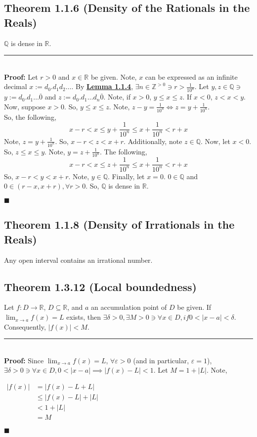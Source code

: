 \documentclass[11pt]{book}
\newcommand{\R}{\mathbb{R}}
\newcommand{\Q}{\mathbb{Q}}
\newcommand{\Z}{\mathbb{Z}}
\newcommand{\horline}{\noindent\rule{14.25cm}{0.6pt}\\}
\newcounter{theorem}
\newcounter{lemma}
\newcommand{\QED}{\begin{flushright}$\blacksquare$\end{flushright}}
\begin{document}
	\subsection{Theorem 1.1.6 (Density of the Rationals in the Reals)}
	\label{subsec:theorem116}
		\begin{theor}
			$\Q$ is dense in $\R$.\hfill\break
			\horline
			\textbf{Proof:} Let $r>0$ and $x \in \R$ be given. Note, $x$ can be expressed as an infinite
			decimal $x := d_0.d_1d_2\dots$. By \hyperref[subsec:lemma114]{\textbf{Lemma 1.1.4}}, $\exists n \in \Z^{>0} \ni r > \frac{1}{10^n}$.
			Let $y,z \in \Q \ni$ $y := d_0.d_1\dots \overline{0}$ and $z := d_0.d_1\dots d_n \overline{0}$. Note,
			if $x > 0$, $y \leq x \leq z$. If $x < 0$, $z < x < y$.\hfill\break
			Now, suppose $x > 0$. So, $y \leq x \leq z$. Note, $z - y = \frac{1}{10^n} \Leftrightarrow z = y + \frac{1}{10^n}$.\\
			So, the following,
			$$ x-r < x \leq y + \frac{1}{10^n} \leq x + \frac{1}{10^n} < r + x$$
			Note, $z = y + \frac{1}{10^n}$. So, $x - r < z < x+r$. Additionally, note $z \in \Q$.\hfill\break
			Now, let $x < 0$. So, $z \leq x \leq y$. Note, $y = z + \frac{1}{10^n}$. The following,
			$$x - r < x \leq z + \frac{1}{10^n} \leq x + \frac{1}{10^n} < r + x$$
			So, $x - r < y < x + r$. Note, $y \in \Q$. Finally, let $x = 0$. $0 \in \Q$ and $0 \in (r-x,x+r), \forall r > 0$.
			So, $\Q$ is dense in $\R$. \QED
		\end{theor}
	\subsection{Theorem 1.1.8 (Density of Irrationals in the Reals)}
	\label{subsec:theorem118}
		\begin{theor}
			Any open interval contains an irrational number.
		\end{theor}
	\subsection{Theorem 1.3.12 (Local boundedness)}
	\label{subsec:theor1312}
		\begin{theor}
			Let $f: D \to \R$, $D \subseteq \R$, and $a$ an accumulation point of $D$ be given. If $\displaystyle\lim_{x \to a}{f(x) = L}$
			exists, then $\exists \delta > 0, \exists M > 0 \ni \forall x \in D, if 0 < |x - a| < \delta$. Consequently, 
			$|f(x)| < M$.\\
			\horline
			\textbf{Proof:} Since $\displaystyle\lim_{x \to a}{f(x) = L}$, $\forall \varepsilon > 0$ (and in particular, $\varepsilon = 1$), $\exists \delta > 0 \ni
			\forall x \in D, 0 < | x - a| \implies |f(x) - L| < 1$. Let $M = 1 + |L|$. Note,
			\begin{center}
				\begin{math}
					\begin{aligned}
						|f(x)| &  = |f(x) - L + L|\\
						& \leq |f(x) - L| + |L|\\
						& < 1+ |L|\\
						& = M
					\end{aligned}
				\end{math}
			\end{center}
			\QED
		\end{theor}
	\newpage
\end{document}
